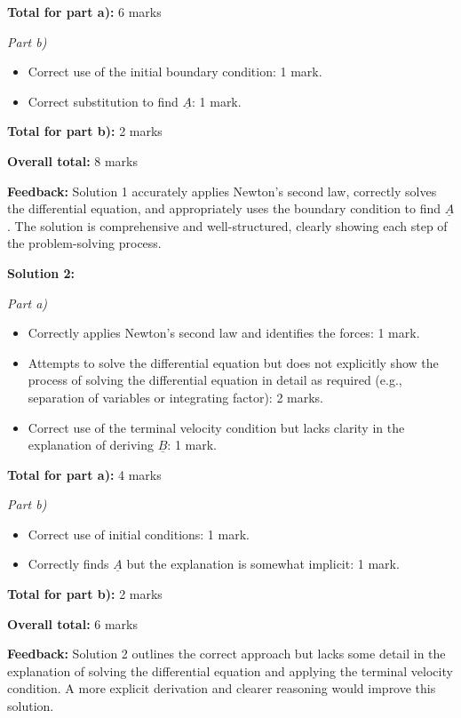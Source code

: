 \documentclass[a4paper,11pt]{article}
\begin{document}
\textbf{Total for part a):} 6 marks

\textit{Part b)}

\begin{itemize}
    \item Correct use of the initial boundary condition: 1 mark.
    \item Correct substitution to find \( \underline{A} \): 1 mark.
\end{itemize}

\textbf{Total for part b):} 2 marks

\textbf{Overall total:} 8 marks

\textbf{Feedback:} Solution 1 accurately applies Newton's second law, correctly solves the differential equation, and appropriately uses the boundary condition to find \( \underline{A} \). The solution is comprehensive and well-structured, clearly showing each step of the problem-solving process.

\textbf{Solution 2:}

\textit{Part a)}

\begin{itemize}
    \item Correctly applies Newton's second law and identifies the forces: 1 mark.
    \item Attempts to solve the differential equation but does not explicitly show the process of solving the differential equation in detail as required (e.g., separation of variables or integrating factor): 2 marks.
    \item Correct use of the terminal velocity condition but lacks clarity in the explanation of deriving \( \underline{B} \): 1 mark.
\end{itemize}

\textbf{Total for part a):} 4 marks

\textit{Part b)}

\begin{itemize}
    \item Correct use of initial conditions: 1 mark.
    \item Correctly finds \( \underline{A} \) but the explanation is somewhat implicit: 1 mark.
\end{itemize}

\textbf{Total for part b):} 2 marks

\textbf{Overall total:} 6 marks

\textbf{Feedback:} Solution 2 outlines the correct approach but lacks some detail in the explanation of solving the differential equation and applying the terminal velocity condition. A more explicit derivation and clearer reasoning would improve this solution.
\end{document}
